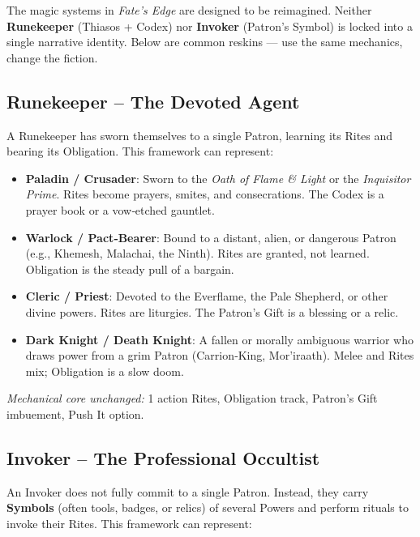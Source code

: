 \begin{tcolorbox}[colback=gray!5!white,colframe=gray!70!black,title=Reskinning the Paths: Runekeeper and Invoker as Familiar Concepts,label=box:reskinning]
    The magic systems in \textit{Fate's Edge} are designed to be reimagined. Neither \textbf{Runekeeper} (Thiasos + Codex) nor \textbf{Invoker} (Patron’s Symbol) is locked into a single narrative identity. Below are common reskins — use the same mechanics, change the fiction.
    
    \subsection*{Runekeeper – The Devoted Agent}
    A Runekeeper has sworn themselves to a single Patron, learning its Rites and bearing its Obligation. This framework can represent:
    
    \begin{itemize}
      \item \textbf{Paladin / Crusader}: Sworn to the \textit{Oath of Flame \& Light} or the \textit{Inquisitor Prime}. Rites become prayers, smites, and consecrations. The Codex is a prayer book or a vow‑etched gauntlet.
      \item \textbf{Warlock / Pact‑Bearer}: Bound to a distant, alien, or dangerous Patron (e.g., Khemesh, Malachai, the Ninth). Rites are granted, not learned. Obligation is the steady pull of a bargain.
      \item \textbf{Cleric / Priest}: Devoted to the Everflame, the Pale Shepherd, or other divine powers. Rites are liturgies. The Patron’s Gift is a blessing or a relic.
      \item \textbf{Dark Knight / Death Knight}: A fallen or morally ambiguous warrior who draws power from a grim Patron (Carrion‑King, Mor’iraath). Melee and Rites mix; Obligation is a slow doom.
    \end{itemize}
    
    \noindent \textit{Mechanical core unchanged:} 1 action Rites, Obligation track, Patron’s Gift imbuement, Push It option.
    
    \subsection*{Invoker – The Professional Occultist}
    An Invoker does not fully commit to a single Patron. Instead, they carry \textbf{Symbols} (often tools, badges, or relics) of several Powers and perform rituals to invoke their Rites. This framework can represent:
    

\end{tcolorbox}
